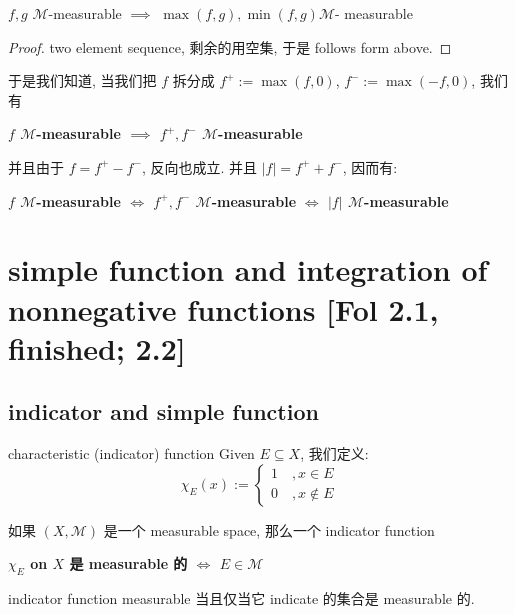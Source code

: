 \documentclass[lang=cn,11pt]{elegantbook}
\begin{document}
\begin{corollary}
    $f,g$ $\mathcal{M}$-measurable $\implies$ $\max(f,g), \min(f,g)$$\mathcal{M}$- measurable 
\end{corollary}
\begin{proof}
    two element sequence, 剩余的用空集, 于是 follows form above.
\end{proof}



\begin{remark}
    于是我们知道, 当我们把 $f$ 拆分成 $f^+ := \max(f,0)$, $f^- := \max(-f,0)$, 我们有 

    \begin{center}
 \textbf{ $f$ $\mathcal{M}$-measurable $\implies$ $f^+, f^-$ $\mathcal{M}$-measurable}
    \end{center}

并且由于 $f = f^+ - f^-$, 反向也成立. 并且 $|f| = f^+ + f^-$, 因而有:
\begin{center}
     \textbf{ $f$ $\mathcal{M}$-measurable $\Longleftrightarrow$ $f^+, f^-$ $\mathcal{M}$-measurable} \textbf{$\Longleftrightarrow$ $|f|$ $\mathcal{M}$-measurable}
\end{center}
\end{remark}








\chapter{simple function and integration of nonnegative functions [Fol 2.1, finished; 2.2]}

\section{indicator and simple function}
\begin{definition}{characteristic (indicator) function}
    Given $E \subseteq X$, 我们定义:
    $$
    \chi_E(x) := \begin{cases}
        1 \quad,x\in E\\
        0 \quad, x\not \in E
    \end{cases}
    $$
\end{definition}

\begin{lemma}
如果 $(X,\mathcal{M})$ 是一个 measurable space, 那么一个 indicator function
\begin{center}
   \textbf{ $\chi_E$ on $X$ 是 measurable 的 $\Longleftrightarrow$ $E \in  \mathcal{M}$}
\end{center}
\end{lemma}
indicator function measurable 当且仅当它 indicate 的集合是 measurable 的.
\end{document}
